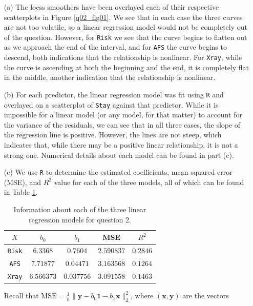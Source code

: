 \documentclass[10pt]{article}
\begin{document}
\begin{itemize}
    \item[(a)] The loess smoothers have been overlayed each of their respective scatterplots in Figure \ref{q02_fig01}. We see that in each case the three 
    curves are not too volatile, so a linear regression model would not be completely out of the question. However, for \texttt{Risk} we see that the curve 
    begins to flatten out as we approach the end of the interval, and for \texttt{AFS} the curve begins to descend, both indications that the relationship is 
    nonlinear.
    For \texttt{Xray}, while the curve is ascending at both the beginning and the end, it is completely flat in the middle, another indication that the 
    relationship is nonlinear. 
    \item[(b)] For each predictor, the linear regression model was fit using \texttt{R} and overlayed on a scatterplot of \texttt{Stay} against that predictor. 
    While it is impossible for a linear model (or any model, for that matter) to account for the variance of the residuals, we can see that in all three cases,
    the slope of the regression line is positive. However, the lines are not steep, which indicates that, while there may be a positive linear relationship,
    it is not a strong one. Numerical details about each model can be found in part (c).
    \item[(c)] We use \texttt{R} to determine the estimated coefficients, mean squared error (MSE), and \(R^2\) value for each of the three models, all of 
    which can be found in Table \ref{q02_tab01}. 
    \begin{table}
        \centering
        \def\arraystretch{1.25}
        \begin{tabular}[ht]{ccccc} \toprule
            \(X\) & \(b_0\) & \(b_1\) & MSE & \(R^2\) \\ \midrule
            \texttt{Risk} & \(6.3368\) & \(0.7604\) & \(2.590837\) & \(0.2846\) \\
            \texttt{AFS} & \(7.71877\) & \(0.04471\) & \(3.163568\) & \(0.1264\) \\
            \texttt{Xray} & \(6.566373\) & \(0.037756\) & \(3.091558\) & \(0.1463\) \\ \bottomrule
        \end{tabular}
        \caption{Information about each of the three linear regression models for question 2.}
        \label{q02_tab01}
    \end{table}
    Recall that \(\mathrm{MSE} = \frac{1}{n}\|\mathbf{y} - b_0 \mathbf{1} - b_1 \mathbf{x}\|_2^2\), where \((\mathbf{x},\mathbf{y})\) are the vectors 

\end{itemize}
\end{document}
